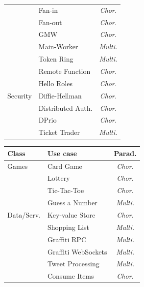 \begin{table}[t]
\begin{minipage}[t]{0.49\textwidth}
\begin{tabular}[t]{@{}llc@{}}
                      & Fan-in & \emph{Chor.} \\
                      & Fan-out & \emph{Chor.} \\
                      & GMW & \emph{Chor.} \\
                      & Main-Worker & \emph{Multi.} \\
                      & Token Ring & \emph{Multi.} \\
                      & Remote Function & \emph{Chor.} \\
                      & Hello Roles & \emph{Chor.} \\
            \midrule
            Security  & Diffie-Hellman & \emph{Chor.} \\
                      & Distributed Auth. & \emph{Chor.} \\
                      & DPrio & \emph{Chor.} \\
                      & Ticket Trader & \emph{Multi.} \\
            \bottomrule
        \end{tabular}
    \end{minipage}
    \hfill
    \begin{minipage}[t]{0.49\textwidth}
        \vspace{0pt}
        \begin{tabular}[t]{@{}llc@{}}
            \toprule
            \textbf{Class} & \textbf{Use case} & \textbf{Parad.} \\
            \midrule
            Games       & Card Game & \emph{Chor.} \\
                        & Lottery & \emph{Chor.} \\
                        & Tic-Tac-Toe & \emph{Chor.} \\
                        & Guess a Number & \emph{Multi.} \\
            \midrule
            Data/Serv.  & Key-value Store & \emph{Chor.} \\
                        & Shopping List & \emph{Multi.} \\
                        & Graffiti RPC & \emph{Multi.} \\
                        & Graffiti WebSockets & \emph{Multi.} \\
                        & Tweet Processing & \emph{Multi.} \\
                        & Consume Items & \emph{Chor.} \\
            \midrule

\end{tabular}
\end{minipage}
\end{table}
